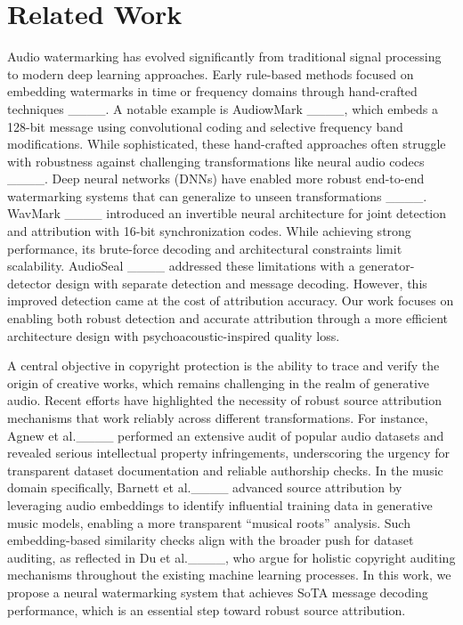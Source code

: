 \section{Related Work}
\label{sec.related}

 Audio watermarking has evolved significantly from traditional signal processing to modern deep learning approaches. Early rule-based methods focused on embedding watermarks in time or frequency domains through hand-crafted techniques ____. A notable example is AudiowMark ____, which embeds a 128-bit message using convolutional coding and selective frequency band modifications. While sophisticated, these hand-crafted approaches often struggle with robustness against challenging transformations like neural audio codecs ____. Deep neural networks (DNNs) have enabled more robust end-to-end watermarking systems that can generalize to unseen transformations ____. WavMark ____ introduced an invertible neural architecture for joint detection and attribution with 16-bit synchronization codes. While achieving strong performance, its brute-force decoding and architectural constraints limit scalability. AudioSeal ____ addressed these limitations with a generator-detector design with separate detection and message decoding. However, this improved detection came at the cost of attribution accuracy. Our work focuses on enabling both robust detection and accurate attribution through a more efficient architecture design with psychoacoustic-inspired quality loss.

 A central objective in copyright protection is the ability to trace and verify the origin of creative works, which remains challenging in the realm of generative audio. Recent efforts have highlighted the necessity of robust source attribution mechanisms that work reliably across different transformations. For instance, Agnew et al.____ performed an extensive audit of popular audio datasets and revealed serious intellectual property infringements, underscoring the urgency for transparent dataset documentation and reliable authorship checks. In the music domain specifically, Barnett et al.____ advanced source attribution by leveraging audio embeddings to identify influential training data in generative music models, enabling a more transparent ``musical roots'' analysis. Such embedding-based similarity checks align with the broader push for dataset auditing, as reflected in Du et al.____, who argue for holistic copyright auditing mechanisms throughout the existing machine learning processes. In this work, we propose a neural watermarking system that achieves SoTA message decoding performance, which is an essential step toward robust source attribution.

